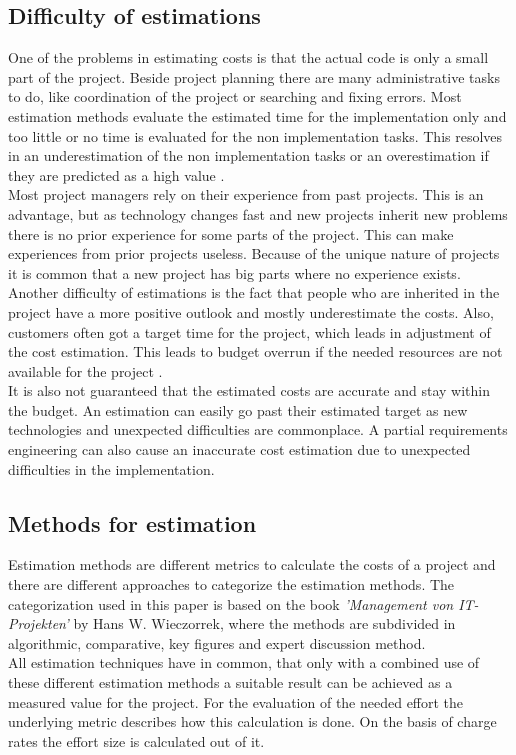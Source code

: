 \subsection{Difficulty of estimations}

One of the problems in estimating costs is that the actual code is only a small part of the project. Beside project planning there are many administrative tasks to do, like coordination of the project or searching and fixing errors. Most estimation methods evaluate the estimated time for the implementation only and too little or no time is evaluated for the non implementation tasks. This resolves in an underestimation of the non implementation tasks or an overestimation if they are predicted as a high value \cite{itplanung}.
\\
Most project managers rely on their experience from past projects. This is an advantage, but as technology changes fast and new projects inherit new problems there is no prior experience for some parts of the project. This can make experiences from prior projects useless. Because of the unique nature of projects it is common that a new project has big parts where no experience exists. Another difficulty of estimations is the fact that people who are inherited in the project have a more positive outlook and mostly underestimate the costs.
Also, customers often got a target time for the project, which leads in adjustment of the cost estimation. This leads to budget overrun if the needed resources are not available for the project \cite{winfwiki}.
\\
It is also not guaranteed that the estimated costs are accurate and stay within the budget. An estimation can easily go past their estimated target as new technologies and unexpected difficulties are commonplace. A partial requirements engineering can also cause an inaccurate cost estimation due to unexpected difficulties in the implementation.\\

\subsection{Methods for estimation}\label{chapter:estimationmethods}

Estimation methods are different metrics to calculate the costs of a project and there are different approaches to categorize the estimation methods. The categorization used in this paper is based on the book \textit{'Management von IT-Projekten'} by Hans W. Wieczorrek, where the methods are subdivided in algorithmic, comparative, key figures and expert discussion method\cite{itplanung}.\\
All estimation techniques have in common, that only with a combined use of these different estimation methods a suitable result can be achieved as a measured value for the project. For the evaluation of the needed effort the underlying metric describes how this calculation is done. On the basis of charge rates the effort size is calculated out of it.\\

